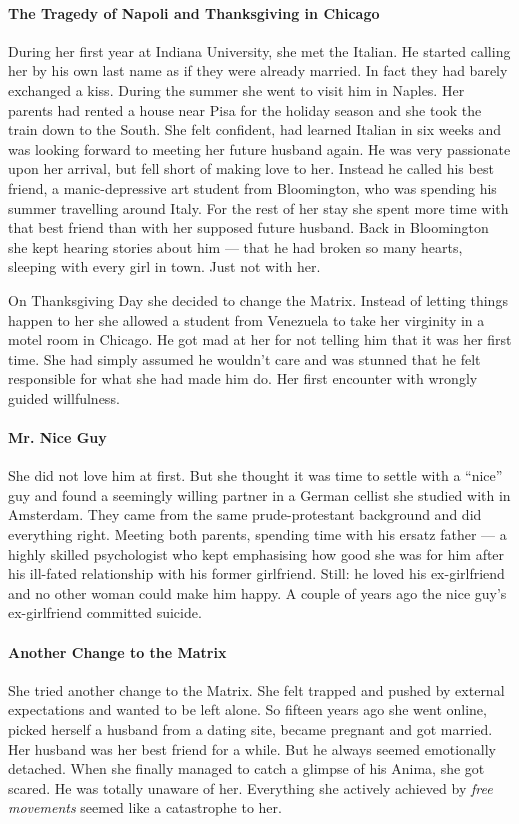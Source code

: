 \paragraph{The Tragedy of Napoli and Thanksgiving in Chicago}
During her first year at Indiana University, she met the Italian. He started calling her by his own last name as if they were already married. In fact they had barely exchanged a kiss. During the summer she went to visit him in Naples. Her parents had rented a house near Pisa for the holiday season and she took the train down to the South. She felt confident, had learned Italian in six weeks and was looking forward to meeting her future husband again. He was very passionate upon her arrival, but fell short of making love to her. Instead he called his best friend, a manic-depressive art student from Bloomington, who was spending his summer travelling around Italy. For the rest of her stay she spent more time with that best friend than with her supposed future husband. Back in Bloomington she kept hearing stories about him — that he had broken so many hearts, sleeping with every girl in town. Just not with her.

On Thanksgiving Day she decided to change the Matrix. Instead of letting things happen to her she allowed a student from Venezuela to take her virginity in a motel room in Chicago. He got mad at her for not telling him that it was her first time. She had simply assumed he wouldn't care and was stunned that he felt responsible for what she had made him do. Her first encounter with wrongly guided willfulness.

\paragraph{Mr. Nice Guy}
She did not love him at first. But she thought it was time to settle with a “nice” guy and found a seemingly willing partner in a German cellist she studied with in Amsterdam. They came from the same prude-protestant background and did everything right. Meeting both parents, spending time with his ersatz father — a highly skilled psychologist who kept emphasising how good she was for him after his ill-fated relationship with his former girlfriend. Still: he loved his ex-girlfriend and no other woman could make him happy. A couple of years ago the nice guy's ex-girlfriend committed suicide.

\paragraph{Another Change to the Matrix}
She tried another change to the Matrix. She felt trapped and pushed by external expectations and wanted to be left alone. So fifteen years ago she went online, picked herself a husband from a dating site, became pregnant and got married. Her husband was her best friend for a while. But he always seemed emotionally detached. When she finally managed to catch a glimpse of his Anima, she got scared. He was totally unaware of her. Everything she actively achieved by \emph{free movements} seemed like a catastrophe to her.

